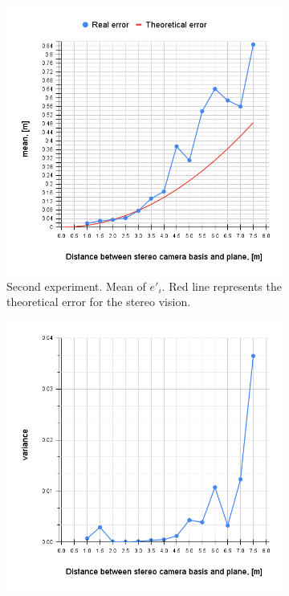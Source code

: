 \begin{figure}[ht]
  \begin{subfigure}[ht]{.49\textwidth}
    \centering
    \includegraphics[width=\textwidth]{graphics/exp2_mean.png}
    \caption[Second experiment. Mean of $e'_i$.]{Second experiment. Mean of $e'_i$. Red line represents the theoretical error for the stereo vision.}
    \label{fig:exp_2_mean}
  \end{subfigure}
  \hfill
  \begin{subfigure}[ht]{0.49\textwidth}
    \centering
    \includegraphics[width=\textwidth]{graphics/exp2_var.png}

\end{subfigure}
\end{figure}
